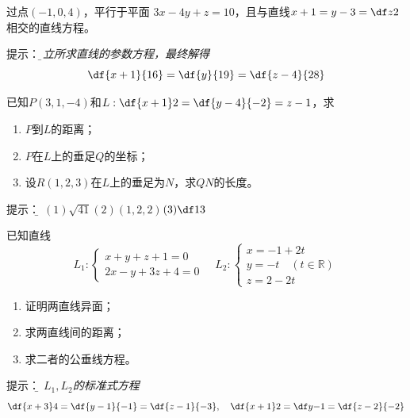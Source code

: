 \begin{frame}
	\linespread{1.2}
	\;过点$(-1,0,4)$，平行于平面
	$3x-4y+z=10$，且与直线$x+1=y-3=\df z2$
	相交的直线方程。

	\pause\alert{提示：}\it\b 建立所求直线的参数方程，最终解得
	$$\df{x+1}{16}=\df{y}{19}=\df{z-4}{28}$$
\end{frame}

\begin{frame}
	\linespread{1.2}
	\;已知$P(3,1,-4)$和$L:\df{x+1}2=\df{y-4}{-2}=z-1$，求
	\begin{enumerate}
	  \item $P$到$L$的距离；
	  \item $P$在$L$上的垂足$Q$的坐标；
	  \item 设$R(1,2,3)$在$L$上的垂足为$N$，求$QN$的长度。
	\end{enumerate}

	\pause\alert{提示：}\it\b
	$(1)\sqrt{41}$\quad$(2)(1,2,2)$\quad$(3)\df13$
\end{frame}

\begin{frame}
	\linespread{1.2}
	\;已知直线
	$$L_1:\left\{\begin{array}{l}
		x+y+z+1=0\\
		2x-y+3z+4=0
	\end{array}\right.
	\quad
	L_2:\left\{\begin{array}{l}
		x=-1+2t\\
		y=-t\quad(t\in\mathbb{R})\\
		z=2-2t
	\end{array}\right.
	$$
	\begin{enumerate}[(1)]
	  \item 证明两直线异面；
	  \item 求两直线间的距离；
	  \item 求二者的公垂线方程。
	\end{enumerate}
	
	\pause\alert{提示：}\it\b
	$L_1,L_2$的标准式方程
	$$\df{x+3}4=\df{y-1}{-1}=\df{z-1}{-3},\quad
	\df{x+1}2=\df y{-1}=\df{z-2}{-2}$$
\end{frame}

